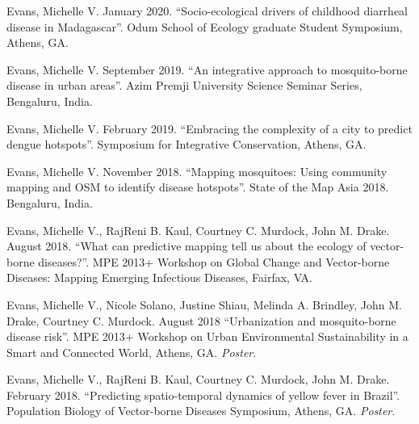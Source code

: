 
\begin{cvitems}
	\bigskip

	\item Evans, Michelle V. January 2020. ``Socio-ecological drivers of childhood diarrheal disease in Madagascar''. Odum School of Ecology graduate Student Symposium, Athens, GA.

	\item Evans, Michelle V. September 2019. ``An integrative approach to mosquito-borne disease in urban areas''. Azim Premji University Science Seminar Series, Bengaluru, India.

	\item Evans, Michelle V. February 2019. ``Embracing the complexity of a city to predict dengue hotspots''. Symposium for Integrative Conservation, Athens, GA.

	\item Evans, Michelle V. November 2018. ``Mapping mosquitoes: Using community mapping and OSM to identify disease hotspots''. State of the Map Asia 2018. Bengaluru, India.

	\item Evans, Michelle V., RajReni B. Kaul, Courtney C. Murdock, John M. Drake. August 2018. ``What can predictive mapping tell us about the ecology of vector-borne diseases?''. MPE 2013+ Workshop on Global Change and Vector-borne Diseases: Mapping Emerging Infectious Diseases, Fairfax, VA.

	\item Evans, Michelle V., Nicole Solano, Justine Shiau, Melinda A. Brindley, John M. Drake, Courtney C. Murdock. August 2018 ``Urbanization and mosquito-borne disease risk''. MPE 2013+ Workshop on Urban Environmental Sustainability in a Smart and Connected World, Athens, GA. \textit{Poster}.

	\item Evans, Michelle V., RajReni B. Kaul, Courtney C. Murdock, John M. Drake. February 2018. ``Predicting spatio-temporal dynamics of yellow fever in Brazil''. Population Biology of Vector-borne Diseases Symposium, Athens, GA. \textit{Poster}.


\end{cvitems}
